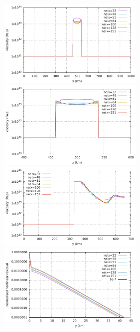\begin{center}
\includegraphics[width=7cm]{python_codes/fieldstone_26/images/horizontal.pdf}
\includegraphics[width=7cm]{python_codes/fieldstone_26/images/horizontal_zoom.pdf}\\
\includegraphics[width=7cm]{python_codes/fieldstone_26/images/vertical.pdf}
\includegraphics[width=7cm]{python_codes/fieldstone_26/images/residual.pdf}
\end{center}

